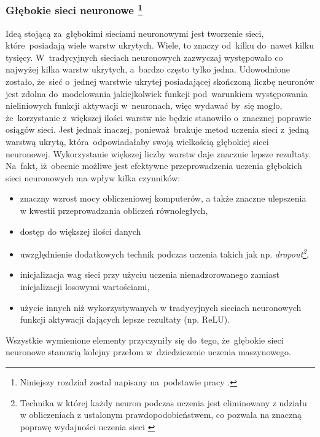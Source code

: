 \subsubsection[Głębokie sieci neuronowe]{Głębokie sieci neuronowe \footnote{Niniejszy rozdział zostal napisany na~podstawie pracy \cite{dnn1}. }}\label{dnn}
Ideą stojącą za~głębokimi sieciami neuronowymi jest tworzenie sieci, które~posiadają wiele warstw ukrytych. Wiele, to znaczy od~kilku do~nawet kilku tysięcy. W~tradycyjnych sieciach neuronowych zazwyczaj występowało co najwyżej kilka warstw ukrytych, a~bardzo często tylko jedna. Udowodnione zostało, że~sieć o~jednej warstwie ukrytej posiadającej skończoną liczbę neuronów jest zdolna do~modelowania jakiejkolwiek funkcji pod~warunkiem występowania nieliniowych funkcji aktywacji w~neuronach\cite{anntheorem}, więc wydawać by~się mogło, że~korzystanie z~większej ilości warstw nie będzie stanowiło o~znacznej poprawie osiągów sieci. Jest jednak inaczej, ponieważ~brakuje metod uczenia sieci z~jedną warstwą ukrytą, która~odpowiadałaby swoją wielkością głębokiej sieci neuronowej. Wykorzystanie większej liczby warstw daje znacznie lepsze rezultaty. Na~fakt, iż~obecnie możliwe jest efektywne przeprowadzenia uczenia głębokich sieci neuronowych ma wpływ kilka czynników:
\begin{itemize}
\item znaczny wzrost mocy obliczeniowej komputerów, a także znaczne ulepszenia w kwestii przeprowadzania obliczeń równoległych,
\item dostęp do większej ilości danych
\item uwzględnienie dodatkowych technik podczas uczenia takich jak np. \textit{dropout\footnote{Technika w której każdy neuron podczas uczenia jest eliminowany z udziału w obliczeniach z ustalonym prawdopodobieństwem, co pozwala na znaczną poprawę wydajności uczenia sieci \cite{srivastava2014dropout}}},
\item inicjalizacja wag sieci przy użyciu uczenia nienadzorowanego zamiast inicjalizacji losowymi wartościami,
\item użycie innych niż wykorzystywanych w tradycyjnych sieciach neuronowych funkcji aktywacji dających lepsze rezultaty (np. ReLU).
\end{itemize}
Wszystkie wymienione elementy przyczyniły się do~tego, że~głębokie sieci neuronowe stanowią kolejny przełom w~dziedziczenie uczenia maszynowego.

